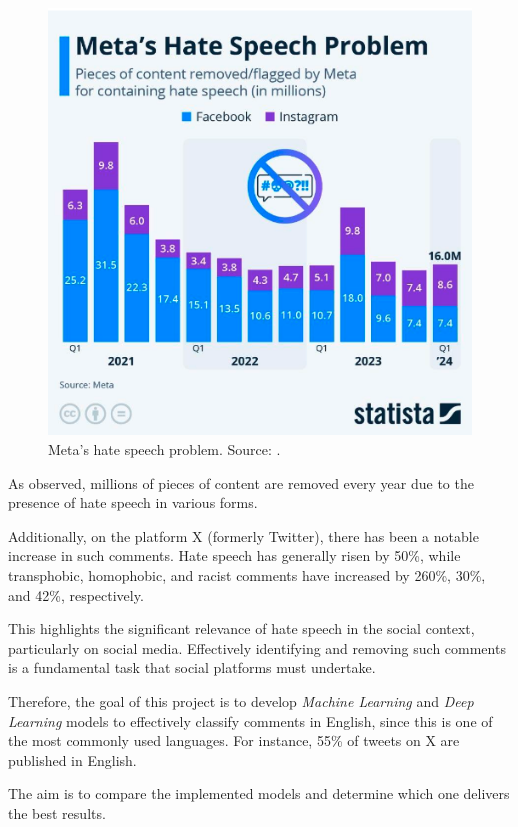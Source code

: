 \begin{figure}[htbp]
    \centering
    \includegraphics[width=0.9\linewidth]{images/MetaHateSpeechProblem.png}
    \caption{Meta's hate speech problem. Source: \cite{zandt2024}.}
    \label{fig:meta_hate_speech_problem}
\end{figure}
 
As observed, millions of pieces of content are removed every year due to the presence of hate speech in various forms.

Additionally, on the platform X (formerly Twitter), there has been a notable increase in such comments. Hate speech has generally risen by 50\%, while transphobic, homophobic, and racist comments have increased by 260\%, 30\%, and 42\%, respectively.

This highlights the significant relevance of hate speech in the social context, particularly on social media. Effectively identifying and removing such comments is a fundamental task that social platforms must undertake.

Therefore, the goal of this project is to develop \textit{Machine Learning} and \textit{Deep Learning} models to effectively classify comments in English, since this is one of the most commonly used languages. For instance, 55\% of tweets on X are published in English.

The aim is to compare the implemented models and determine which one delivers the best results.
